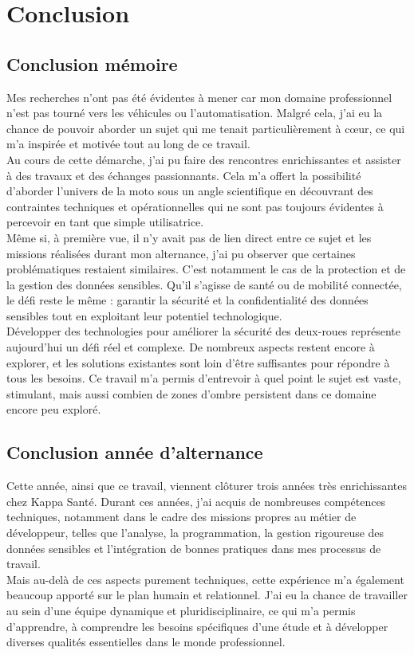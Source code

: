 \section{Conclusion}


\subsection{Conclusion mémoire}
Mes recherches n’ont pas été évidentes à mener car mon domaine professionnel  n’est pas tourné vers les véhicules ou l’automatisation. Malgré cela, j’ai eu la chance de pouvoir aborder un sujet qui me tenait particulièrement à cœur, ce qui m'a inspirée et motivée tout au long de ce travail.\\
Au cours de cette démarche, j’ai pu faire des rencontres enrichissantes et assister à des travaux et des échanges passionnants. Cela m’a offert la possibilité d’aborder l’univers de la moto sous un angle scientifique en découvrant des contraintes techniques et opérationnelles qui ne sont pas toujours évidentes à percevoir en tant que simple utilisatrice.\\
Même si, à première vue, il n’y avait pas de lien direct entre ce sujet et les missions réalisées durant mon alternance, j’ai pu observer que certaines problématiques restaient similaires. C’est notamment le cas de la protection et de la gestion des données sensibles. Qu’il s’agisse de santé ou de mobilité connectée, le défi reste le même : garantir la sécurité et la confidentialité des données sensibles tout en exploitant leur potentiel technologique.\\

\vspace{0.5cm}
Développer des technologies pour améliorer la sécurité des deux-roues représente aujourd’hui un défi réel et complexe. De nombreux aspects restent encore à explorer, et les solutions existantes sont loin d’être suffisantes pour répondre à tous les besoins. Ce travail m’a permis d'entrevoir à quel point le sujet est vaste, stimulant, mais aussi combien de zones d’ombre persistent dans ce domaine encore peu exploré.


\subsection{Conclusion année d'alternance}
Cette année, ainsi que ce travail, viennent clôturer trois années très enrichissantes chez Kappa Santé. Durant ces années, j'ai acquis de nombreuses compétences techniques, notamment dans le cadre des missions propres au métier de développeur, telles que l'analyse, la programmation, la gestion rigoureuse des données sensibles et l’intégration de bonnes pratiques dans mes processus de travail.\\
Mais au-delà de ces aspects purement techniques, cette expérience m'a également beaucoup apporté sur le plan humain et relationnel. J'ai eu la chance de travailler au sein d'une équipe dynamique et pluridisciplinaire, ce qui m’a permis d’apprendre, à comprendre les besoins spécifiques d'une étude et à développer diverses qualités essentielles dans le monde professionnel.\\

